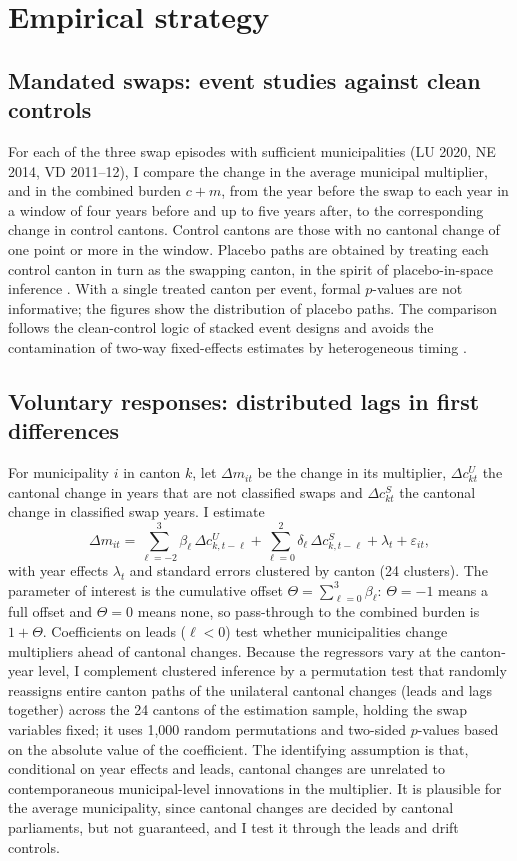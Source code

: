 \documentclass[11pt,a4paper]{article}
\begin{document}
\section{Empirical strategy}\label{sec:strategy}

\subsection{Mandated swaps: event studies against clean controls}
For each of the three swap episodes with sufficient municipalities (LU 2020, NE 2014, VD 2011--12), I compare the change in the average municipal multiplier, and in the combined burden $c+m$, from the year before the swap to each year in a window of four years before and up to five years after, to the corresponding change in control cantons. Control cantons are those with no cantonal change of one point or more in the window. Placebo paths are obtained by treating each control canton in turn as the swapping canton, in the spirit of placebo-in-space inference \citep{Abadie2010,ConleyTaber2011}. With a single treated canton per event, formal $p$-values are not informative; the figures show the distribution of placebo paths. The comparison follows the clean-control logic of stacked event designs \citep{Cengiz2019} and avoids the contamination of two-way fixed-effects estimates by heterogeneous timing \citep{GoodmanBacon2021}.

\subsection{Voluntary responses: distributed lags in first differences}
For municipality $i$ in canton $k$, let $\Delta m_{it}$ be the change in its multiplier, $\Delta c^{U}_{kt}$ the cantonal change in years that are not classified swaps and $\Delta c^{S}_{kt}$ the cantonal change in classified swap years. I estimate
\begin{equation}
\Delta m_{it}=\sum_{\ell=-2}^{3}\beta_\ell\,\Delta c^{U}_{k,t-\ell}+\sum_{\ell=0}^{2}\delta_\ell\,\Delta c^{S}_{k,t-\ell}+\lambda_t+\varepsilon_{it},
\label{eq:dl}
\end{equation}
with year effects $\lambda_t$ and standard errors clustered by canton (24 clusters). The parameter of interest is the cumulative offset $\Theta=\sum_{\ell=0}^{3}\beta_\ell$: $\Theta=-1$ means a full offset and $\Theta=0$ means none, so pass-through to the combined burden is $1+\Theta$. Coefficients on leads ($\ell<0$) test whether municipalities change multipliers ahead of cantonal changes. Because the regressors vary at the canton-year level, I complement clustered inference by a permutation test that randomly reassigns entire canton paths of the unilateral cantonal changes (leads and lags together) across the 24 cantons of the estimation sample, holding the swap variables fixed; it uses 1,000 random permutations and two-sided $p$-values based on the absolute value of the coefficient. The identifying assumption is that, conditional on year effects and leads, cantonal changes are unrelated to contemporaneous municipal-level innovations in the multiplier. It is plausible for the average municipality, since cantonal changes are decided by cantonal parliaments, but not guaranteed, and I test it through the leads and drift controls.
\end{document}
